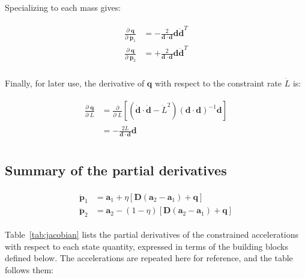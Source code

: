 \documentclass[]{article}
\newcommand{\pd}[2]{\frac{\partial\;#1}{\partial\;#2}}
\newcommand{\pddown}[2]{\frac{\partial}{\partial\;#2} \left[ #1 \right] }
\begin{document}
Specializing to each mass gives:

\begin{align}
\begin{split}
    \pd{\mathbf{q}}{\dot{\mathbf{p}}_1} &= -\frac{2}{\mathbf{d} \cdot \mathbf{d}} \mathbf{d} \dot{\mathbf{d}}^T \\
    \pd{\mathbf{q}}{\dot{\mathbf{p}}_2} &= +\frac{2}{\mathbf{d} \cdot \mathbf{d}} \mathbf{d} \dot{\mathbf{d}}^T \\
\end{split}
\end{align}

Finally, for later use, the derivative of $\mathbf{q}$ with respect to the constraint rate $\dot{L}$ is:

\begin{align}
\begin{split}
    \pd{\mathbf{q}}{\dot{L}}
    &= \pddown{(\dot{\mathbf{d}} \cdot \dot{\mathbf{d}} - \dot{L}^2) (\mathbf{d} \cdot \mathbf{d})^{-1} \mathbf{d}}{\dot{L}} \\
    &= -\frac{2 \dot{L}}{\mathbf{d} \cdot \mathbf{d}} \mathbf{d} \\
\end{split}
\end{align}

\clearpage
\subsection{Summary of the partial derivatives}

\begin{align}
\begin{split}
    \ddot{\mathbf{p}}_1 &= \mathbf{a}_1 + \eta \left[ \mathbf{D} (\mathbf{a}_2 - \mathbf{a}_1) + \mathbf{q} \right] \\
    \ddot{\mathbf{p}}_2 &= \mathbf{a}_2 - (1-\eta) \left[ \mathbf{D} (\mathbf{a}_2 - \mathbf{a}_1) + \mathbf{q} \right]
\end{split}
\end{align}

Table~\ref{tab:jacobian} lists the partial derivatives of the constrained accelerations with respect to each state quantity, expressed in terms of the building blocks defined below.  The accelerations are repeated here for reference, and the table follows them:
\end{document}
